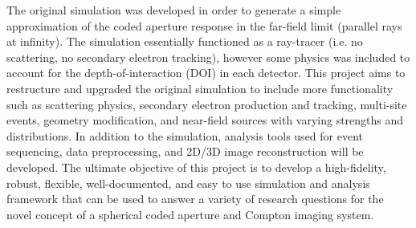 \documentclass[10pt]{article}
\begin{document}
The original simulation was developed in order to generate a simple approximation of the coded aperture response in the far-field limit (parallel rays at infinity). The simulation essentially functioned as a ray-tracer (i.e. no scattering, no secondary electron tracking), however some physics was included to account for the depth-of-interaction (DOI) in each detector. This project aims to restructure and upgraded the original simulation to include more functionality such as scattering physics, secondary electron production and tracking, multi-site events, geometry modification, and near-field sources with varying strengths and distributions. In addition to the simulation, analysis tools used for event sequencing, data preprocessing, and 2D/3D image reconstruction will be developed. The ultimate objective of this project is to develop a high-fidelity, robust, flexible, well-documented, and easy to use simulation and analysis framework that can be used to answer a variety of research questions for the novel concept of a spherical coded aperture and Compton imaging system. 
\end{document}
